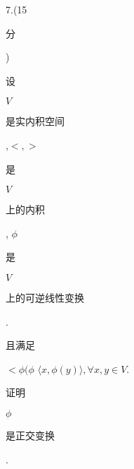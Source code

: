 \documentclass[10pt]{article}
\begin{document}
7.(15 \begin{CJK}{UTF8}{mj}分\end{CJK}) \begin{CJK}{UTF8}{mj}设\end{CJK} $V$ \begin{CJK}{UTF8}{mj}是实内积空间\end{CJK},$<,>$ \begin{CJK}{UTF8}{mj}是\end{CJK} $V$ \begin{CJK}{UTF8}{mj}上的内积\end{CJK}, $\phi$ \begin{CJK}{UTF8}{mj}是\end{CJK} $V$ \begin{CJK}{UTF8}{mj}上的可逆线性变换\end{CJK}. \begin{CJK}{UTF8}{mj}且满足\end{CJK} $<\phi(\phi$ $\langle x, \phi(y)\rangle, \forall x, y \in V$. \begin{CJK}{UTF8}{mj}证明\end{CJK} $\phi$ \begin{CJK}{UTF8}{mj}是正交变换\end{CJK}.
\end{document}
